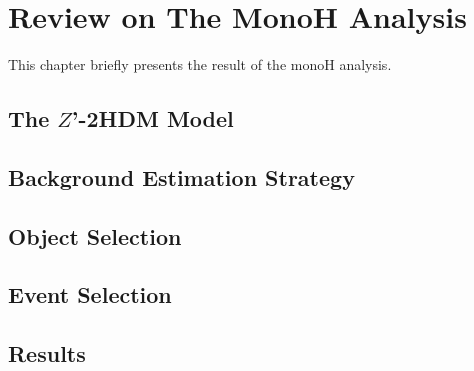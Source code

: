 \documentclass[class=NTHU_thesis, crop=false]{standalone}
\begin{document}
\chapter{Review on The MonoH Analysis}
This chapter briefly presents the result of the monoH analysis.

\section{The $Z$'-2HDM Model}

\section{Background Estimation Strategy}

\section{Object Selection}

\section{Event Selection}

\section{Results}
\end{document}
